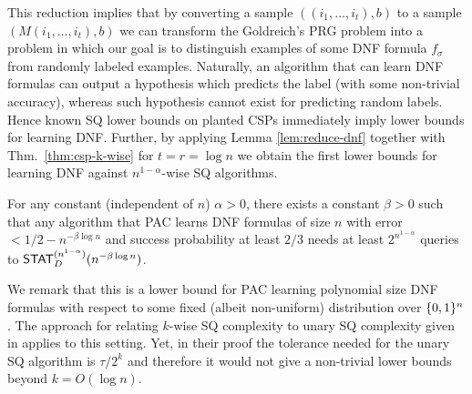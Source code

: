 This reduction implies that by converting a sample $((i_1, \dots, i_t),b)$ to a sample $(M(i_1, \dots, i_t),b)$ we can transform the Goldreich's PRG problem into a problem in which our goal is to distinguish examples of some DNF formula $f_\sigma$ from randomly labeled examples. Naturally, an algorithm that can learn DNF formulas can output a hypothesis which predicts the label (with some non-trivial accuracy), whereas such hypothesis cannot exist for predicting random labels. Hence known SQ lower bounds on planted CSPs \cite{FeldmanPV:13} immediately imply lower bounds for learning DNF. Further, by applying Lemma \ref{lem:reduce-dnf} together with Thm.~\ref{thm:csp-k-wise} for $t=r=\log n$ we obtain the first lower bounds for learning DNF against $n^{1-\alpha}$-wise SQ algorithms.
\begin{theorem}\label{thm:dnf-k-wise}
For any constant (independent of $n$) $\alpha >0$, there exists a constant $\beta>0$ such that
 any  algorithm that PAC learns DNF formulas of size $n$ with error $<1/2 - n^{- \beta \log n}$ and success probability at least $2/3$ needs at least $2^{n^{1-\alpha}}$ queries to $\mathsf{STAT}^{(n^{1-\alpha})}_D(n^{- \beta \log n})$.
\end{theorem}
We remark that this is a lower bound for PAC learning polynomial size DNF formulas with respect to some fixed (albeit non-uniform) distribution over $\{0, 1\}^n$. The approach for relating $k$-wise SQ complexity to unary SQ complexity given in \cite{blum2003noise} applies to this setting. Yet, in their proof the tolerance needed for the unary SQ algorithm is $\tau/2^k$ and therefore it would not give a non-trivial lower bounds beyond $k=O(\log n)$.

